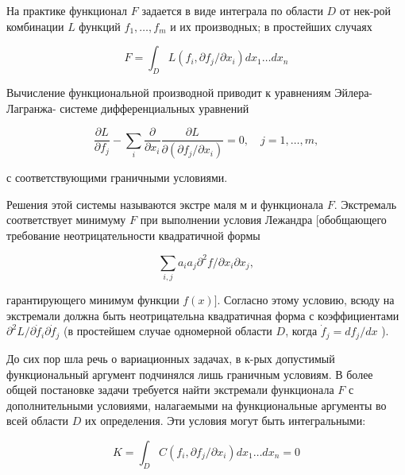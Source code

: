 \documentclass[10pt]{article}
\begin{document}
На практике функционал $F$ задается в виде интеграла по области $D$ от нек-рой комбинации $L$ функций $f_{1}, \ldots, f_{m}$ и их производных; в простейших случаях



\[

F=\int_{D} L\left(f_{i}, \partial f_{j} / \partial x_{i}\right) d x_{1} \ldots d x_{n}

\]



Вычисление функциональной производной приводит к уравнениям Эйлера-Лагранжа- системе дифференциальных уравнений



\[

\frac{\partial L}{\partial f_{j}}-\sum_{i} \frac{\partial}{\partial x_{i}} \frac{\partial L}{\partial\left(\partial f_{j} / \partial x_{i}\right)}=0, \quad j=1, \ldots, m,

\]



с соответствующими граничными условиями.



Решения этой системы называются экстре маля м и функционала $F$. Экстремаль соответствует минимуму $F$ при выполнении условия Лежандра [обобщающего требование неотрицательности квадратичной формы



\[

\sum_{i, j} a_{i} a_{j} \partial^{2} f / \partial x_{i} \partial x_{j},

\]



гарантирующего минимум функции $f(x)]$. Согласно этому условию, всюду на экстремали должна быть неотрицательна квадратичная форма с коэффициентами $\partial^{2} L / \partial \dot{f}_{i} \partial \dot{f}_{j}$ (в простейшем случае одномерной области $D$, когда $\dot{f}_{j}=d f_{j} / d x$ ).



До сих пор шла речь о вариационных задачах, в к-рых допустимый функциональный аргумент подчинялся лишь граничным условиям. В более общей постановке задачи требуется найти экстремали функционала $F$ с дополнительными условиями, налагаемыми на функциональные аргументы во всей области $D$ их определения. Эти условия могут быть интегральными:



\[

K=\int_{D} C\left(f_{i}, \partial f_{j} / \partial x_{i}\right) d x_{1} \ldots d x_{n}=0

\]
\end{document}

